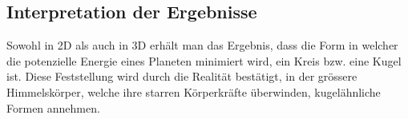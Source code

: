 \subsection{Interpretation der Ergebnisse}
Sowohl in 2D als auch in 3D erhält man das Ergebnis, dass die Form in welcher die potenzielle Energie eines Planeten minimiert wird, ein Kreis bzw. eine Kugel ist.
Diese Feststellung wird durch die Realität bestätigt, in der grössere Himmelskörper, welche ihre starren Körperkräfte überwinden, kugelähnliche Formen annehmen.


